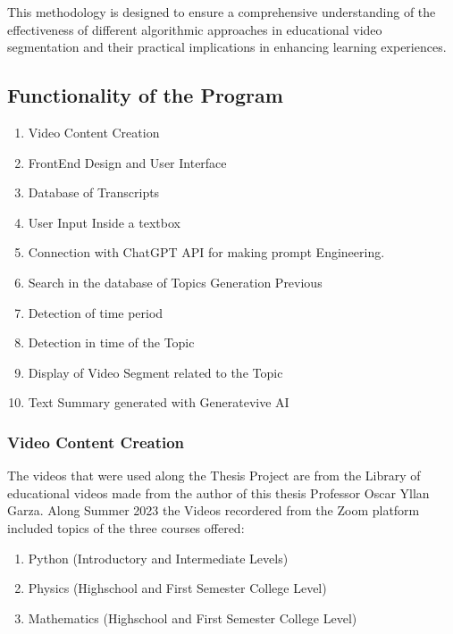 This methodology is designed to ensure a comprehensive understanding of the effectiveness of different algorithmic approaches in educational video segmentation and their practical implications in enhancing learning experiences.

\subsection{Functionality of the Program}

\begin{enumerate}
    \item Video Content Creation
    \item FrontEnd Design and User Interface
    \item Database of Transcripts
    \item User Input Inside a textbox
    \item Connection with ChatGPT API for making prompt Engineering.
    \item Search in the database of Topics Generation Previous
    \item Detection of time period
    \item Detection in time of the Topic
    \item Display of Video Segment related to the Topic
    \item Text Summary generated with Generatevive AI
    
\end{enumerate}



\subsubsection{Video Content Creation} 


The videos that were used along the Thesis Project are from the Library of educational videos made from the author of this thesis Professor Oscar Yllan Garza. Along Summer 2023 the Videos recordered from the Zoom platform included topics of the three courses offered:

\begin{enumerate}
    \item Python (Introductory and Intermediate Levels)
    \item Physics (Highschool and First Semester College Level)
    \item Mathematics (Highschool and First Semester College Level)
\end{enumerate}



